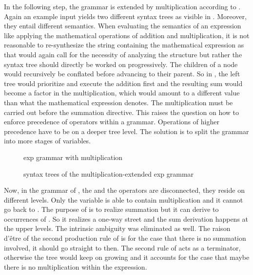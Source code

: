 \FloatBarrier

In the following step, the grammar is extended by multiplication according to . Again an example input  yields two different syntax trees as visible in . Moreover, they entail different semantics. When evaluating the semantics of an expression like applying the mathematical operations of addition and multiplication, it is not reasonable to re-synthesize the string containing the mathematical expression as that would again call for the necessity of analyzing the structure but rather the syntax tree should directly be worked on progressively. The children of a node would recursively be conflated before advancing to their parent. So in , the left tree would prioritize and execute the addition first and the resulting sum would become a factor in the multiplication, which would amount to a different value than what the mathematical expression  denotes. The multiplication must be carried out before the summation directive. This raises the question on how to enforce precedence of operators within a grammar. Operations of higher precedence have to be on a deeper tree level. The solution is to split the grammar into more stages of variables.

\begin{figure}
	\centering

	

	\caption{exp grammar with multiplication}
	\label{fig:grammar_example_ambPrec}
\end{figure}

\begin{figure}
	\begin{center}
		
	\end{center}

	\caption{syntax trees of the multiplication-extended exp grammar}
	\label{fig:tree_example_diffSemantics}
\end{figure}

\FloatBarrier

Now, in the grammar of , the \textterminal{+} and the \textterminal{*} operators are disconnected, they reside on different levels. Only the  variable is able to contain multiplication and it cannot go back to . The purpose of  is to realize summation but it can derive to occurrences of . So it realizes a one-way street and the sum derivation happens at the upper levels. The intrinsic ambiguity was eliminated as well. The raison d'être of the second production rule of  is for the case that there is no summation involved, it should go straight to  then. The second rule of  acts as a terminator, otherwise the tree would keep on growing and it accounts for the case that maybe there is no multiplication within the expression.

